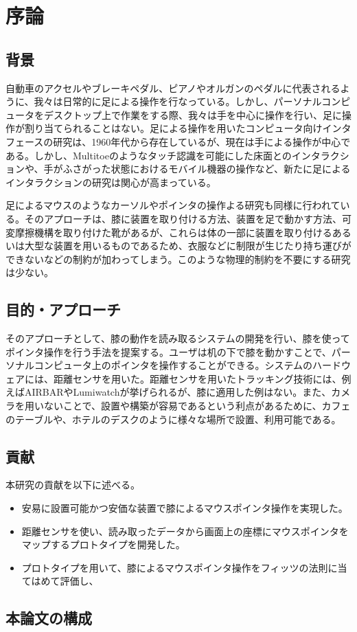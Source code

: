 \chapter{序論}

\section{背景}
自動車のアクセルやブレーキペダル、ピアノやオルガンのペダルに代表されるように、我々は日常的に足による操作を行なっている。しかし、パーソナルコンピュータをデスクトップ上で作業をする際、我々は手を中心に操作を行い、足に操作が割り当てられることはない。足による操作を用いたコンピュータ向けインタフェースの研究は、1960年代から存在している\cite{1698228}が、現在は手による操作が中心である。しかし、Multitoe\cite{Augsten:2010:MHI:1866029.1866064}のようなタッチ認識を可能にした床面とのインタラクションや、手がふさがった状態におけるモバイル機器の操作\cite{Fan:2017:ESF:3123021.3123043, okumura_2011}など、新たに足によるインタラクションの研究は関心が高まっている。\par
足によるマウスのようなカーソルやポインタの操作よる研究も同様に行われている。そのアプローチは、膝に装置を取り付ける方法\cite{1698228}、装置を足で動かす方法\cite{Pearson:1986:MMD:22627.22392, Pearson:1988:EET:49108.1046356}、可変摩擦機構を取り付けた靴\cite{Horodniczy:2017:FHE:3025453.3025625}があるが、これらは体の一部に装置を取り付けるあるいは大型な装置を用いるものであるため、衣服などに制限が生じたり持ち運びができないなどの制約が加わってしまう。このような物理的制約を不要にする研究は少ない\cite{velloso:hal-01599657}。








\section{目的・アプローチ}
そのアプローチとして、膝の動作を読み取るシステムの開発を行い、膝を使ってポインタ操作を行う手法を提案する。ユーザは机の下で膝を動かすことで、パーソナルコンピュータ上のポインタを操作することができる。システムのハードウェアには、距離センサを用いた。距離センサを用いたトラッキング技術には、例えばAIRBAR\cite{AIRBAR}やLumiwatch\cite{Xiao:2018:LOP:3173574.3173669}が挙げられるが、膝に適用した例はない。また、カメラを用いないことで、設置や構築が容易であるという利点があるために、カフェのテーブルや、ホテルのデスクのように様々な場所で設置、利用可能である。\\

\section{貢献}
本研究の貢献を以下に述べる。
\begin{itemize}
	\item 安易に設置可能かつ安価な装置で膝によるマウスポインタ操作を実現した。
	\item 距離センサを使い、読み取ったデータから画面上の座標にマウスポインタをマップするプロトタイプを開発した。
	\item プロトタイプを用いて、膝によるマウスポインタ操作をフィッツの法則に当てはめて評価し、\TODO{[結果]}
\end{itemize}
\section{本論文の構成}
